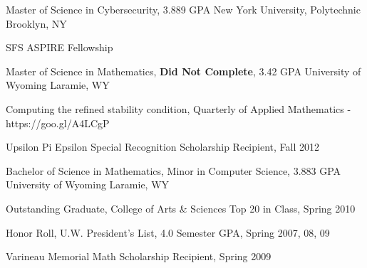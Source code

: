 


\begin{cventries}

\cventry
{Master of Science in Cybersecurity, 3.889 GPA} %
{New York University, Polytechnic} %
{Brooklyn, NY} %
{} %
{
\begin{cvitems}
\item {SFS ASPIRE Fellowship}
\end{cvitems}
}

\cventry
{Master of Science in Mathematics, \textbf{Did Not Complete}, 3.42 GPA} %
{University of Wyoming} %
{Laramie, WY} %
{} %
{
\begin{cvitems}
\item{Computing the refined stability condition, Quarterly of Applied Mathematics - https://goo.gl/A4LCgP}
\item {Upsilon Pi Epsilon Special Recognition Scholarship Recipient, Fall 2012}
\end{cvitems}
}

\cventry
{Bachelor of Science in Mathematics, Minor in Computer Science, 3.883 GPA} %
{University of Wyoming} %
{Laramie, WY} %
{} %
{
\begin{cvitems}
    \item {Outstanding Graduate, College of Arts \& Sciences Top 20 in Class, Spring 2010}
\begin{displaySection}
    \item {Honor Roll, U.W. President’s List, 4.0 Semester GPA, Spring 2007, 08, 09}
    \item {Varineau Memorial Math Scholarship Recipient, Spring 2009}
\end{displaySection}
\end{cvitems}
}


\end{cventries}